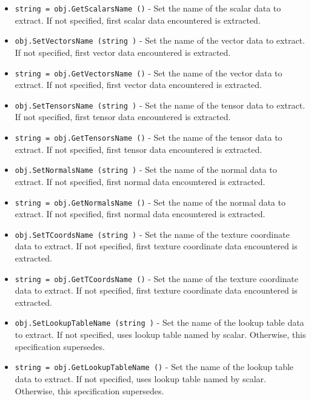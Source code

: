 \begin{itemize}
\item  \verb|string = obj.GetScalarsName ()| -  Set the name of the scalar data to extract. If not specified, first 
 scalar data encountered is extracted.

\item  \verb|obj.SetVectorsName (string )| -  Set the name of the vector data to extract. If not specified, first 
 vector data encountered is extracted.

\item  \verb|string = obj.GetVectorsName ()| -  Set the name of the vector data to extract. If not specified, first 
 vector data encountered is extracted.

\item  \verb|obj.SetTensorsName (string )| -  Set the name of the tensor data to extract. If not specified, first 
 tensor data encountered is extracted.

\item  \verb|string = obj.GetTensorsName ()| -  Set the name of the tensor data to extract. If not specified, first 
 tensor data encountered is extracted.

\item  \verb|obj.SetNormalsName (string )| -  Set the name of the normal data to extract. If not specified, first 
 normal data encountered is extracted.

\item  \verb|string = obj.GetNormalsName ()| -  Set the name of the normal data to extract. If not specified, first 
 normal data encountered is extracted.

\item  \verb|obj.SetTCoordsName (string )| -  Set the name of the texture coordinate data to extract. If not specified,
 first texture coordinate data encountered is extracted.

\item  \verb|string = obj.GetTCoordsName ()| -  Set the name of the texture coordinate data to extract. If not specified,
 first texture coordinate data encountered is extracted.

\item  \verb|obj.SetLookupTableName (string )| -  Set the name of the lookup table data to extract. If not specified, uses 
 lookup table named by scalar. Otherwise, this specification supersedes.

\item  \verb|string = obj.GetLookupTableName ()| -  Set the name of the lookup table data to extract. If not specified, uses 
 lookup table named by scalar. Otherwise, this specification supersedes.


\end{itemize}
